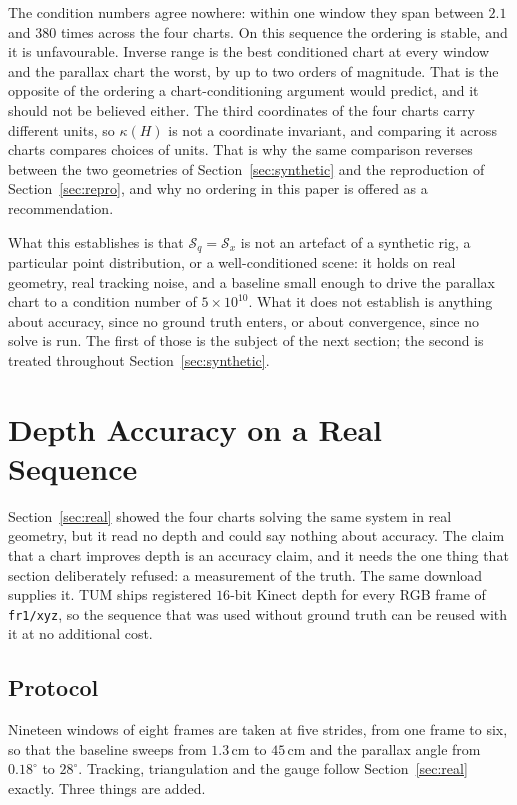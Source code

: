 \documentclass[11pt,a4paper]{article}
\theoremstyle{definition}
\theoremstyle{remark}
\begin{document}
The condition numbers agree nowhere: within one window they span between $2.1$ and $380$ times across the four charts. On this sequence the ordering is stable, and it is unfavourable. Inverse range is the best conditioned chart at every window and the parallax chart the worst, by up to two orders of magnitude. That is the opposite of the ordering a chart-conditioning argument would predict, and it should not be believed either. The third coordinates of the four charts carry different units, so $\kappa(H)$ is not a coordinate invariant, and comparing it across charts compares choices of units. That is why the same comparison reverses between the two geometries of Section~\ref{sec:synthetic} and the reproduction of Section~\ref{sec:repro}, and why no ordering in this paper is offered as a recommendation.

What this establishes is that $\mathcal S_q=\mathcal S_x$ is not an artefact of a synthetic rig, a particular point distribution, or a well-conditioned scene: it holds on real geometry, real tracking noise, and a baseline small enough to drive the parallax chart to a condition number of $5\times10^{10}$. What it does not establish is anything about accuracy, since no ground truth enters, or about convergence, since no solve is run. The first of those is the subject of the next section; the second is treated throughout Section~\ref{sec:synthetic}.

\section{Depth Accuracy on a Real Sequence}
\label{sec:depth}

Section~\ref{sec:real} showed the four charts solving the same system in real geometry, but it read no depth and could say nothing about accuracy. The claim that a chart improves depth is an accuracy claim, and it needs the one thing that section deliberately refused: a measurement of the truth. The same download supplies it. TUM ships registered $16$-bit Kinect depth for every RGB frame of \texttt{fr1/xyz}, so the sequence that was used without ground truth can be reused with it at no additional cost.

\subsection{Protocol}

Nineteen windows of eight frames are taken at five strides, from one frame to six, so that the baseline sweeps from $1.3$\,cm to $45$\,cm and the parallax angle from $0.18^\circ$ to $28^\circ$. Tracking, triangulation and the gauge follow Section~\ref{sec:real} exactly. Three things are added.
\end{document}
